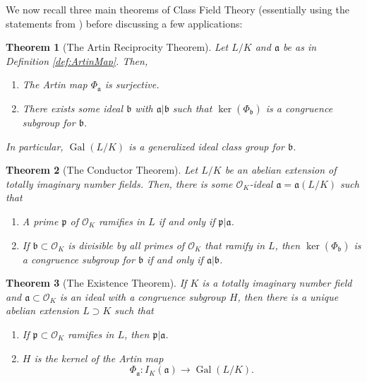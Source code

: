 \documentclass{amsart}
\newtheorem{thm}{Theorem}[section]
\theoremstyle{definition}
\theoremstyle{remark}
\numberwithin{equation}{section}
\newcommand{\cO}{\mathcal O}
\newcommand{\fka}{\mathfrak a}
\newcommand{\fkb}{\mathfrak b}
\newcommand{\fkp}{\mathfrak p}
\DeclareMathOperator{\Gal}{Gal}
\begin{document}
 We now recall three main theorems of Class Field Theory (essentially using the statements from \cite{CoxPrimes}) before discussing a few applications:
 
 
 \begin{thm}[The Artin Reciprocity Theorem] \label{thm:ArtinReciprocityTheorem} 
 Let $L/K$ and $\fka$ be as in Definition \ref{def:ArtinMap}. Then,
 \begin{enumerate}
 \item The Artin map $\Phi_{\fka}$ is surjective.
 \item There exists some ideal $\fkb$ with $\fka|\fkb$ such that $\ker(\Phi_{\fkb})$ is a congruence subgroup for $\fkb$.
 \end{enumerate}
 In particular, $\Gal(L/K)$ is a generalized ideal class group for $\fkb$.
 \end{thm}
 
 \begin{thm}[The Conductor Theorem]\label{thm:ConductorTheorem}
 Let $L/K$ be an abelian extension of totally imaginary number fields. Then, there is some $\cO_{K}$-ideal $\fka = \fka(L/K)$ such that
 \begin{enumerate}
 \item A prime $\fkp$ of $\cO_{K}$ ramifies in $L$ if and only if $\fkp|\fka$.
 \item If $\fkb \subset \cO_{K}$ is divisible by all primes of $\cO_{K}$ that ramify in $L$, then $\ker(\Phi_{\fkb})$ is a congruence subgroup for $\fkb$ if and only if $\fka|\fkb$.
 \end{enumerate} 
 \end{thm}
 
 \begin{thm} [The Existence Theorem] \label{thm:ExistenceTheorem}
 If $K$ is a totally imaginary number field and $\fka \subset \cO_{K}$ is an ideal with a congruence subgroup $H$, then there is a unique abelian extension $L \supset K$ such that
 \begin{enumerate}
 \item If $\fkp \subset \cO_{K}$ ramifies in $L$, then $\fkp|\fka$.
 \item $H$ is the kernel of the Artin map
 \[
 \Phi_{\fka}: I_{K}(\fka) \to \Gal(L/K).
 \]
 \end{enumerate}
 \end{thm}
\end{document}
